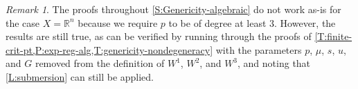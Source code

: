 \documentclass{amsart}
\newcommand{\R}{\mathbb{R}}
\theoremstyle{definition}
\theoremstyle{remark}
\newtheorem{remark}[subsubsection]{Remark}
\begin{document}
\begin{remark}
\label{R:X-is-Rn-case}
The proofs throughout \cref{S:Genericity-algebraic} do not work as-is for the case $X = \R^n$ because we require $p$ to be of degree at least $3$. However, the results are still true, as can be verified by running through the proofs of \cref{T:finite-crit-pt,P:exp-reg-alg,T:genericity-nondegeneracy} with the parameters $p$, $\mu$, $s$, $u$, and $G$ removed from the definition of $W^1$, $W^2$, and $W^3$, and noting that \cref{L:submersion} can still be applied.
\end{remark}




\end{document}
